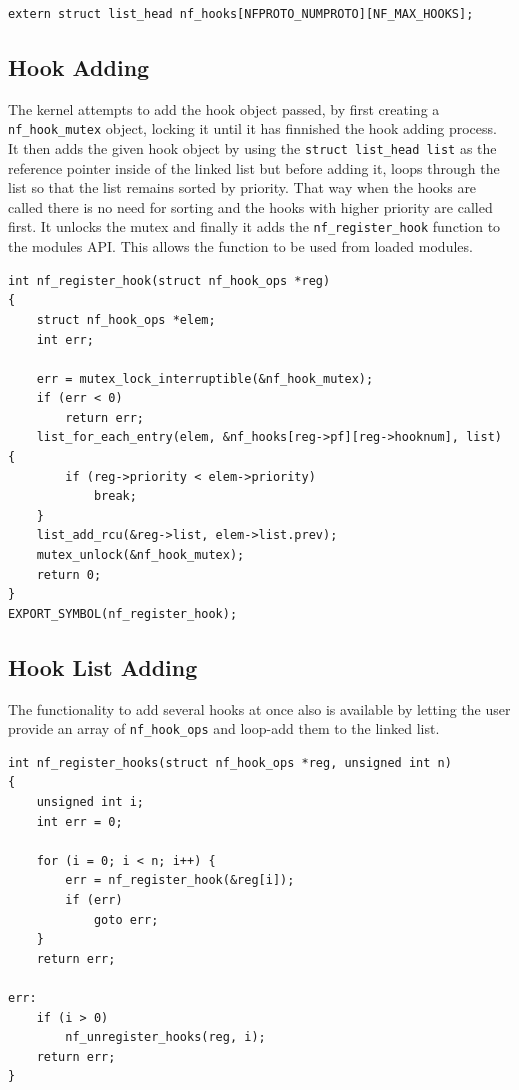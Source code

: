 \documentclass[a4paper,10pt]{article}
\begin{document}
\begin{lstlisting}
extern struct list_head nf_hooks[NFPROTO_NUMPROTO][NF_MAX_HOOKS];
\end{lstlisting}

\subsection{Hook Adding}\label{hook_add}
The kernel attempts to add the hook object passed, by first creating a \verb|nf_hook_mutex| object, locking it until it has finnished the hook adding process. It then adds the given hook object by using the \verb|struct list_head list| as the reference pointer inside of the linked list but before adding it, loops through the list so that the list remains sorted by priority. That way when the hooks are called there is no need for sorting and the hooks with higher priority are called first. It unlocks the mutex and finally it adds the \verb|nf_register_hook| function to the modules API. This allows the function to be used from loaded modules. 

\begin{lstlisting}
int nf_register_hook(struct nf_hook_ops *reg)
{
	struct nf_hook_ops *elem;
	int err;

	err = mutex_lock_interruptible(&nf_hook_mutex);
	if (err < 0)
		return err;
	list_for_each_entry(elem, &nf_hooks[reg->pf][reg->hooknum], list) {
		if (reg->priority < elem->priority)
			break;
	}
	list_add_rcu(&reg->list, elem->list.prev);
	mutex_unlock(&nf_hook_mutex);
	return 0;
}
EXPORT_SYMBOL(nf_register_hook);
\end{lstlisting}

\subsection{Hook List Adding}\label{hook_list_adding}
The functionality to add several hooks at once also is available by letting the user provide an array of \verb|nf_hook_ops| and loop-add them to the linked list.

\begin{lstlisting}
int nf_register_hooks(struct nf_hook_ops *reg, unsigned int n)
{
	unsigned int i;
	int err = 0;

	for (i = 0; i < n; i++) {
		err = nf_register_hook(&reg[i]);
		if (err)
			goto err;
	}
	return err;

err:
	if (i > 0)
		nf_unregister_hooks(reg, i);
	return err;
}
\end{lstlisting}
\end{document}
